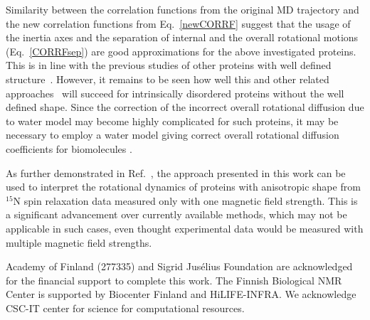\documentclass[journal=jpcbfk,manuscript=article]{achemso}
\providecommand{\DIFadd}[1]{{\protect\color{blue}\uwave{#1}}} %
\providecommand{\DIFaddbegin}{} %
\providecommand{\DIFaddend}{} %
\begin{document}
Similarity between the correlation functions from the original MD trajectory and
the new correlation functions from Eq.~\ref{newCORRF} 
suggest that the usage of the inertia axes
and the separation of internal and the overall rotational motions
(Eq.~\ref{CORRFsep}) are good approximations for the above investigated
proteins. This is in line with the previous studies of other  
proteins with well defined structure~\cite{wong08,allner15}. However, it remains to be seen
how well this and other related approaches~\cite{prompers02,anderson12,chia18} 
will succeed for intrinsically disordered proteins without
the well defined shape. Since the correction of the incorrect overall
rotational diffusion due to water model may become highly complicated for such proteins,
it may be necessary to employ a water model giving correct
overall rotational diffusion coefficients for biomolecules \DIFaddbegin \DIFadd{\mbox{%
\cite{takemura12,debiec16}}%
}\DIFaddend .

As further demonstrated in Ref.~, the approach presented in this work can be used to interpret the
rotational dynamics of proteins with anisotropic shape from $^{15}$N
spin relaxation data measured only with one magnetic field strength.
This is a significant advancement over currently available methods,
which may not be applicable in such cases, even thought experimental
data would be measured with multiple magnetic field strengths.


\begin{acknowledgement}
  Academy of Finland (277335) and Sigrid Jus{\' e}lius Foundation are acknowledged for the financial support
  to complete this work. The Finnish Biological NMR Center is supported by Biocenter Finland and HiLIFE-INFRA.
  We acknowledge CSC-IT center for science for computational resources.
\end{acknowledgement}
\end{document}
